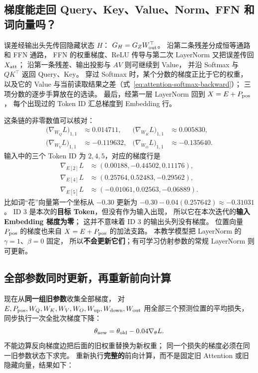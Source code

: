 \subsection{梯度能走回 Query、Key、Value、Norm、FFN 和词向量吗？}
\label{sec:gradient-paths}

误差经输出头先传回隐藏状态 $H$：
$G_H=G_ZW_{\rm out}^\top$。
沿第二条残差分成恒等通路和 FFN 通路，
FFN 的权重梯度、ReLU 传导与第二次 LayerNorm
又把误差传回 $X_{\rm att}$；
沿第一条残差、输出投影与 $AV$ 则可继续到 Value，
并沿 Softmax 与 $QK^\top$ 返回 Query、Key。
穿过 Softmax 时，某个分数的梯度正比于它的权重，
以及它的 Value 与当前读取结果之差（式~\eqref{eq:attention-softmax-backward}）；
三项分数的逐步手算放在的选读。
最后，经第一层 LayerNorm 回到 $X=E+P_{\rm pos}$，
每个出现过的 Token ID 汇总梯度到 Embedding 行。

这条链的非零数值可以核对：
\[
\begin{aligned}
\bigl(\nabla_{W_Q}L\bigr)_{1,1}&\approx 0.014711,&
\bigl(\nabla_{W_K}L\bigr)_{1,1}&\approx 0.005830,\\
\bigl(\nabla_{W_V}L\bigr)_{1,1}&\approx-0.119632,&
\bigl(\nabla_{W_O}L\bigr)_{1,1}&\approx-0.135640.
\end{aligned}
\]
输入中的三个 Token ID 为 $2,4,5$，对应的梯度行是
\[
\begin{aligned}
\nabla_{E[2]}L&\approx(0.00188,-0.44502,0.11176),\\
\nabla_{E[4]}L&\approx(0.25764,0.52483,-0.29562),\\
\nabla_{E[5]}L&\approx(-0.01061,0.02563,-0.06889).
\end{aligned}
\]
比如词“花”向量第一个坐标从 $-0.30$
更新为 $-0.30-0.04(0.257642)\approx-0.31031$。
ID 3 是本次的\textbf{目标 Token}，但没有作为输入出现，
所以它在本次迭代的\textbf{输入 Embedding 梯度为零}；
这并不意味着 ID 3 的输出头列没有梯度。
位置向量 $P_{\rm pos}$ 的梯度也来自 $X=E+P_{\rm pos}$ 的加法支路。
本教学模型把 LayerNorm 的 $\gamma=1$、$\beta=0$ 固定，
所以\textbf{不会更新它们}；有可学习仿射参数的常规 LayerNorm 则可更新。

\subsection{全部参数同时更新，再重新前向计算}

现在从\textbf{同一组旧参数}收集全部梯度，
对 $E,P_{\rm pos},W_Q,W_K,W_V,W_O,W_{\rm up},W_{\rm down},W_{\rm out}$
用全部三个预测位置的平均损失，同步执行一次全批次梯度下降：
\[
\theta_{\rm new}=\theta_{\rm old}-0.04\nabla_\theta L.
\]
不能边算反向梯度边把后面的旧权重替换为新权重；
同一个损失的梯度必须在同一旧参数状态下求完。
重新执行\textbf{完整的}前向计算，而不是固定旧 Attention
或旧隐藏向量，结果如下：

